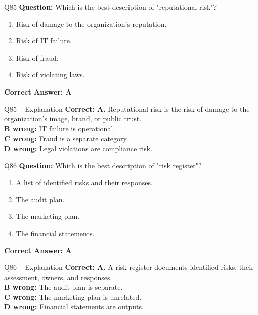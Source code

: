 \documentclass[aspectratio=169,10pt]{beamer}
\begin{document}
	\begin{frame}[t]{Q85}
		\small
		\textbf{Question:} Which is the best description of "reputational risk"?
		\begin{enumerate}[label=\Alph*.,itemsep=1pt,topsep=2pt]
			\item Risk of damage to the organization's reputation.
			\item Risk of IT failure.
			\item Risk of fraud.
			\item Risk of violating laws.
		\end{enumerate}
		\vspace{4pt}
		\textbf{Correct Answer: A}
	\end{frame}
	
	\begin{frame}[t]{Q85 -- Explanation}
		\small
		\textbf{Correct: A.} Reputational risk is the risk of damage to the organization's image, brand, or public trust. \\[4pt]
		\textbf{B wrong:} IT failure is operational. \\[2pt]
		\textbf{C wrong:} Fraud is a separate category. \\[2pt]
		\textbf{D wrong:} Legal violations are compliance risk.
	\end{frame}
	
	\begin{frame}[t]{Q86}
		\small
		\textbf{Question:} Which is the best description of "risk register"?
		\begin{enumerate}[label=\Alph*.,itemsep=1pt,topsep=2pt]
			\item A list of identified risks and their responses.
			\item The audit plan.
			\item The marketing plan.
			\item The financial statements.
		\end{enumerate}
		\vspace{4pt}
		\textbf{Correct Answer: A}
	\end{frame}
	
	\begin{frame}[t]{Q86 -- Explanation}
		\small
		\textbf{Correct: A.} A risk register documents identified risks, their assessment, owners, and responses. \\[4pt]
		\textbf{B wrong:} The audit plan is separate. \\[2pt]
		\textbf{C wrong:} The marketing plan is unrelated. \\[2pt]
		\textbf{D wrong:} Financial statements are outputs.
	\end{frame}
	
\end{document}
